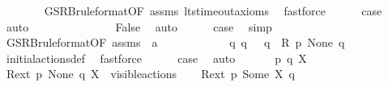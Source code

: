 \begin{isabellebody}
\ \ \ \ \ \ \isamarkupfalse%
\ GSRB{\isacharunderscore}{\kern0pt}ruleformat{\isacharparenleft}{\kern0pt}{}{\isacharparenright}{\kern0pt}{\isacharbrackleft}{\kern0pt}OF\ assms{\isacharbrackright}{\kern0pt}\ lts{\isacharunderscore}{\kern0pt}timeout{\isacharunderscore}{\kern0pt}axioms\ \isamarkupfalse%
\ fastforce\isanewline
\ \ \ \ \isamarkupfalse%
\ {\isacharquery}{\kern0pt}case\ \isamarkupfalse%
\ auto\isanewline
\ \ \isamarkupfalse%
\isanewline
\ \ \ \ \isamarkupfalse%
\ {}\isanewline
\ \ \ \ \isamarkupfalse%
\ False\ \isamarkupfalse%
\ auto\isanewline
\ \ \ \ \isamarkupfalse%
\ {\isacharquery}{\kern0pt}case\ \isamarkupfalse%
\ simp\isanewline
\ \ \isamarkupfalse%
\isanewline
\ \ \ \ \isamarkupfalse%
\ GSRB{\isacharunderscore}{\kern0pt}ruleformat{\isacharparenleft}{\kern0pt}{}{\isacharparenright}{\kern0pt}{\isacharbrackleft}{\kern0pt}OF\ assms{\isacharcomma}{\kern0pt}\ \ {\isacharquery}{\kern0pt}a{\isacharequal}{\kern0pt}{\isasymtau}{\isacharbrackright}{\kern0pt}\isanewline
\ \ \ \ \isamarkupfalse%
\ {}\isanewline
\ \ \ \ \isamarkupfalse%
\ {\isacartoucheopen}{\isasymexists}q{\isacharprime}{\kern0pt}{\isachardot}{\kern0pt}\ q\ {\isasymlongmapsto}{\isasymtau}\ \ q{\isacharprime}{\kern0pt}\ {\isasymand}\ R\ p{\isacharprime}{\kern0pt}\ None\ q{\isacharprime}{\kern0pt}{\isacartoucheclose}\isanewline
\ \ \ \ \ \ \isamarkupfalse%
\ initial{\isacharunderscore}{\kern0pt}actions{\isacharunderscore}{\kern0pt}def\ \isamarkupfalse%
\ fastforce\isanewline
\ \ \ \ \isamarkupfalse%
\ {\isacharquery}{\kern0pt}case\ \isamarkupfalse%
\ auto\isanewline
\ \ \isamarkupfalse%
\isanewline
{}\isamarkupfalse%
\isanewline
\ \ \isamarkupfalse%
\ p\ q\ X\isanewline
\ \ \isamarkupfalse%
\ {\isacartoucheopen}{\isacharquery}{\kern0pt}R{\isacharunderscore}{\kern0pt}ext\ p\ None\ q{\isacartoucheclose}\ {\isacartoucheopen}X\ {\isasymsubseteq}\ visible{\isacharunderscore}{\kern0pt}actions{\isacartoucheclose}\isanewline
\ \ \isamarkupfalse%
\ {\isacartoucheopen}{\isacharquery}{\kern0pt}R{\isacharunderscore}{\kern0pt}ext\ p\ {\isacharparenleft}{\kern0pt}Some\ X{\isacharparenright}{\kern0pt}\ q{\isacartoucheclose}\ \isanewline
\ \ \ \ \isamarkupfalse%

\end{isabellebody}
